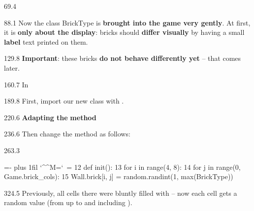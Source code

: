 \documentclass{aslab}
\makeatletter
\newcommand*\kw[1]{\textcolor{codeorange}{#1}}
\newcommand*\fn[1]{\textcolor{codecyan}{#1}}
\newcommand*\num[1]{\textcolor{codered}{#1}}
\newenvironment{pycode}{\par\ttfamily\hyphenchar\font=-1
  \lineskiplimit=-\maxdimen\lineskip=0pt\parindent=0pt
  \parfillskip=0pt plus 1fil\relax
  \catcode`\^^M=\active\catcode`\ =\active\py@setup\py@gobble}{}
\newcommand*\emo[1]{\makebox[18bp][l]{\emoji{#1}}}
\makeatother
\begin{document}
\nextpage
\begin{region}{69.4}
\end{region}

\begin{region}[pitch=13.8]{88.1}
Now the class BrickType is \textbf{brought into the game very gently}. At
first, it is \textbf{only about the display}: bricks should \textbf{differ
visually} by having a small \textbf{label} text printed on them.
\end{region}

\begin{region}{129.8}
\textbf{Important}: these bricks \textbf{do not behave differently yet} --
that comes later.
\end{region}

\begin{region}{160.7}
\emo{1F9F1}In 
\end{region}

\begin{region}{189.8}
First, import our new class with .
\end{region}

\begin{region}{220.6}
\emo{1F6E0}\textbf{Adapting the}  \textbf{method}
\end{region}

\begin{region}{236.6}
Then change the method  as follows:
\end{region}

\begin{region}[]{263.3}
\begin{pycode}
 \kw{12}     \kw{def} \fn{init}():
 \kw{13}         \kw{for} i \kw{in} \fn{range}(\num{4}, \num{8}):
 \kw{14}             \kw{for} j \kw{in} \fn{range}(\num{0}, Game.brick\_cols):
 \kw{15}                 Wall.brick[i, j] = random.randint(\num{1}, \fn{max}(BrickType))
\end{pycode}
\end{region}

\begin{region}[pitch=13.5]{324.5}
Previously, all cells there were bluntly filled with  -- now each
cell gets a random  value (from  up to and including
).
\end{region}
\end{document}
